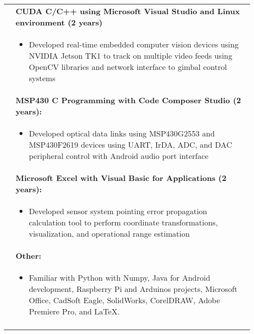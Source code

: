\documentclass{article}[16pt]
\newlength{\lcolw}
\newlength{\rcolw}
\newlength{\hlcolw}
\newlength{\itemmargin}
\begin{document}
\begin{tabular}{L{\hlcolw}  L{\rcolw}}
& \textbf{CUDA C/C++ using Microsoft Visual Studio and Linux environment (2 years)}\\
&
\vspace{-0.25in}
\begin{itemize}[leftmargin = \itemmargin]
\item Developed real-time embedded computer vision devices using NVIDIA Jetson TK1 to track on multiple video feeds using OpenCV libraries and network interface to gimbal control systems
\end{itemize} \\

& \textbf{MSP430 C Programming with Code Composer Studio (2 years):} \\
&
\vspace{-0.25in}
\begin{itemize}[leftmargin = \itemmargin]
\item Developed optical data links using MSP430G2553 and MSP430F2619 devices using UART, IrDA, ADC, and DAC peripheral control with Android audio port interface
\end{itemize} \\

& \textbf{Microsoft Excel with Visual Basic for Applications (2 years):}\\
&
\vspace{-0.25in}
\begin{itemize}[leftmargin = \itemmargin]
\item Developed sensor system pointing error propagation calculation tool to perform coordinate transformations, visualization, and operational range estimation
\end{itemize} \\


& \textbf{Other:} \\
&
\vspace{-0.25in}
\begin{itemize}[leftmargin = \itemmargin]
\item Familiar with Python with Numpy, Java for Android development, Raspberry Pi and Arduinos projects, Microsoft Office, CadSoft Eagle, SolidWorks, CorelDRAW, Adobe Premiere Pro, and \LaTeX.
\end{itemize}
\\

\hline \\
\end{tabular}
\end{document}
